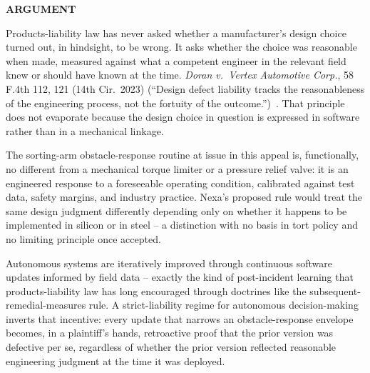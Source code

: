 
\begin{center}
  {\large\bfseries\color{courtnavy} ARGUMENT}
\end{center}
\medskip



Products-liability law has never asked whether a manufacturer's design choice turned out, in hindsight, to be wrong. It asks whether the choice was reasonable when made, measured against what a competent engineer in the relevant field knew or should have known at the time. \emph{Doran v.\ Vertex Automotive Corp.}, 58 F.4th 112, 121 (14th Cir.\ 2023) (``Design defect liability tracks the reasonableness of the engineering process, not the fortuity of the outcome.'')~\cite{doran2023}. That principle does not evaporate because the design choice in question is expressed in software rather than in a mechanical linkage.

The sorting-arm obstacle-response routine at issue in this appeal is, functionally, no different from a mechanical torque limiter or a pressure relief valve: it is an engineered response to a foreseeable operating condition, calibrated against test data, safety margins, and industry practice. Nexa's proposed rule would treat the same design judgment differently depending only on whether it happens to be implemented in silicon or in steel -- a distinction with no basis in tort policy and no limiting principle once accepted.


Autonomous systems are iteratively improved through continuous software updates informed by field data -- exactly the kind of post-incident learning that products-liability law has long encouraged through doctrines like the subsequent-remedial-measures rule. A strict-liability regime for autonomous decision-making inverts that incentive: every update that narrows an obstacle-response envelope becomes, in a plaintiff's hands, retroactive proof that the prior version was defective per se, regardless of whether the prior version reflected reasonable engineering judgment at the time it was deployed.

